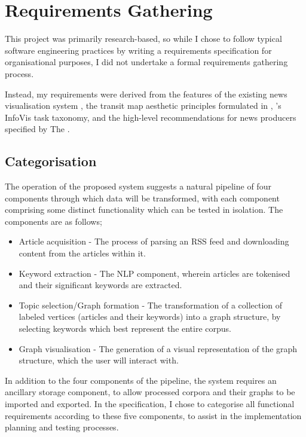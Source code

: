 \section{Requirements Gathering}
This project was primarily research-based, so while I chose to follow typical software engineering practices by writing a requirements specification for organisational purposes, I did not undertake a formal requirements gathering process.

Instead, my requirements were derived from the features of the existing news visualisation system \citep{GeneratingInformationMaps}, the transit map aesthetic principles formulated in \citep{AutomaticMetroMapLayoutThesis, AutomaticMetroMapLayout}, 's InfoVis task taxonomy, and the high-level recommendations for news producers specified by The \cite{anewmodelfornews}.

\subsection{Categorisation}
The operation of the proposed system suggests a natural pipeline of four components through which data will be transformed, with each component comprising some distinct functionality which can be tested in isolation. The components are as follows;
\begin{itemize}
	\item Article acquisition - The process of parsing an RSS feed and downloading content from the articles within it.
	\item Keyword extraction - The NLP component, wherein articles are tokenised and their significant keywords are extracted.
	\item Topic selection/Graph formation - The transformation of a collection of labeled vertices (articles and their keywords) into a graph structure, by selecting keywords which best represent the entire corpus.
	\item Graph visualisation - The generation of a visual representation of the graph structure, which the user will interact with.
\end{itemize}
In addition to the four components of the pipeline, the system requires an ancillary storage component, to allow processed corpora and their graphs to be imported and exported. In the specification, I chose to categorise all functional requirements according to these five components, to assist in the implementation planning and testing processes.

